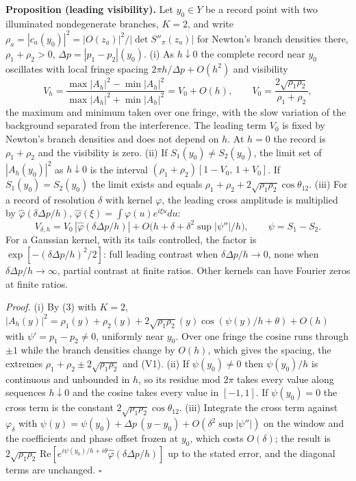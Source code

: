 \documentclass[11pt,a4paper]{article}
\begin{document}
\textbf{Proposition (leading visibility).} Let \(y_0\in Y\) be a record
point with two illuminated nondegenerate branches, \(K=2\), and write
\(\rho_a=|c_a(y_0)|^2=|O(z_a)|^2/|\det S''_\pi(z_a)|\) for Newton's
branch densities there, \(\rho_1+\rho_2>0\),
\(\Delta p=|p_1-p_2|(y_0)\). (i) As \(h\downarrow0\) the complete record
near \(y_0\) oscillates with local fringe spacing
\(2\pi h/\Delta p+O(h^2)\) and visibility
\[V_h=\frac{\max|A_h|^2-\min|A_h|^2}{\max|A_h|^2+\min|A_h|^2}
=V_0+O(h),\qquad V_0=\frac{2\sqrt{\rho_1\rho_2}}{\rho_1+\rho_2},\tag{V1}\]
the maximum and minimum taken over one fringe, with the slow variation
of the background separated from the interference. The leading term
\(V_0\) is fixed by Newton's branch densities and does not depend on
\(h\). At \(h=0\) the record is \(\rho_1+\rho_2\) and the visibility is
zero. (ii) If \(S_1(y_0)\neq S_2(y_0)\), the limit set of
\(|A_h(y_0)|^2\) as \(h\downarrow0\) is the interval
\((\rho_1+\rho_2)[1-V_0,\,1+V_0]\). If \(S_1(y_0)=S_2(y_0)\) the limit
exists and equals \(\rho_1+\rho_2+2\sqrt{\rho_1\rho_2}\cos\theta_{12}\).
(iii) For a record of resolution \(\delta\) with kernel \(\varphi\), the
leading cross amplitude is multiplied by
\(\hat\varphi(\delta\Delta p/h)\),
\(\hat\varphi(\xi)=\int\varphi(u)e^{i\xi u}du\):
\[V_{\delta,h}=V_0\,|\hat\varphi(\delta\Delta p/h)|
+O\big(h+\delta+\delta^2\sup|\psi''|/h\big),\qquad\psi=S_1-S_2.\tag{V2}\]
For a Gaussian kernel, with its tails controlled, the factor is
\(\exp[-(\delta\Delta p/h)^2/2]\): full leading contrast when
\(\delta\Delta p/h\to0\), none when \(\delta\Delta p/h\to\infty\),
partial contrast at finite ratios. Other kernels can have Fourier zeros
at finite ratios.

\emph{Proof.} (i) By (3) with \(K=2\),
\(|A_h(y)|^2=\rho_1(y)+\rho_2(y)+2\sqrt{\rho_1\rho_2}(y)\cos(\psi(y)/h+\theta)+O(h)\)
with \(\psi'=p_1-p_2\neq0\), uniformly near \(y_0\). Over one fringe the
cosine runs through \(\pm1\) while the branch densities change by
\(O(h)\), which gives the spacing, the extremes
\(\rho_1+\rho_2\pm2\sqrt{\rho_1\rho_2}\) and (V1). (ii) If
\(\psi(y_0)\neq0\) then \(\psi(y_0)/h\) is continuous and unbounded in
\(h\), so its residue mod \(2\pi\) takes every value along sequences
\(h\downarrow0\) and the cosine takes every value in \([-1,1]\). If
\(\psi(y_0)=0\) the cross term is the constant
\(2\sqrt{\rho_1\rho_2}\cos\theta_{12}\). (iii) Integrate the cross term
against \(\varphi_\delta\) with
\(\psi(y)=\psi(y_0)+\Delta p\,(y-y_0)+O(\delta^2\sup|\psi''|)\) on the
window and the coefficients and phase offset frozen at \(y_0\), which
costs \(O(\delta)\); the result is
\(2\sqrt{\rho_1\rho_2}\,\mathrm{Re}[e^{i\psi(y_0)/h+i\theta}\hat\varphi(\delta\Delta p/h)]\)
up to the stated error, and the diagonal terms are unchanged.
\(\square\)
\end{document}
